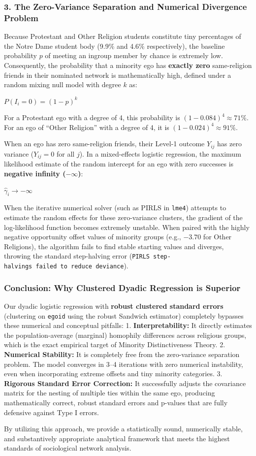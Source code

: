 \documentclass[
  letterpaper,
  DIV=11,
  numbers=noendperiod]{scrartcl}
\begin{document}
\subsubsection{3. The Zero-Variance Separation and Numerical Divergence
Problem}\label{the-zero-variance-separation-and-numerical-divergence-problem}

Because Protestant and Other Religion students constitute tiny
percentages of the Notre Dame student body (9.9\% and 4.6\%
respectively), the baseline probability \(p\) of meeting an ingroup
member by chance is extremely low. Consequently, the probability that a
minority ego has \textbf{exactly zero} same-religion friends in their
nominated network is mathematically high, defined under a random mixing
null model with degree \(k\) as:

\(P(I_i = 0) = (1 - p)^k\)

For a Protestant ego with a degree of 4, this probability is
\((1 - 0.084)^4 \approx 71\%\). For an ego of ``Other Religion'' with a
degree of 4, it is \((1 - 0.024)^4 \approx 91\%\).

When an ego has zero same-religion friends, their Level-1 outcome
\(Y_{ij}\) has zero variance (\(Y_{ij} = 0\) for all \(j\)). In a
mixed-effects logistic regression, the maximum likelihood estimate of
the random intercept for an ego with zero successes is \textbf{negative
infinity (\(-\infty\))}:

\(\hat{\gamma}_i \to -\infty\)

When the iterative numerical solver (such as PIRLS in \texttt{lme4})
attempts to estimate the random effects for these zero-variance
clusters, the gradient of the log-likelihood function becomes extremely
unstable. When paired with the highly negative opportunity offset values
of minority groups (e.g., \(-3.70\) for Other Religions), the algorithm
fails to find stable starting values and diverges, throwing the standard
step-halving error
(\texttt{PIRLS\ step-halvings\ failed\ to\ reduce\ deviance}).

\subsubsection{Conclusion: Why Clustered Dyadic Regression is
Superior}\label{conclusion-why-clustered-dyadic-regression-is-superior}

Our dyadic logistic regression with \textbf{robust clustered standard
errors} (clustering on \texttt{egoid} using the robust Sandwich
estimator) completely bypasses these numerical and conceptual pitfalls:
1. \textbf{Interpretability:} It directly estimates the
population-average (marginal) homophily differences across religious
groups, which is the exact empirical target of Minority Distinctiveness
Theory. 2. \textbf{Numerical Stability:} It is completely free from the
zero-variance separation problem. The model converges in 3--4 iterations
with zero numerical instability, even when incorporating extreme offsets
and tiny minority categories. 3. \textbf{Rigorous Standard Error
Correction:} It successfully adjusts the covariance matrix for the
nesting of multiple ties within the same ego, producing mathematically
correct, robust standard errors and p-values that are fully defensive
against Type I errors.

By utilizing this approach, we provide a statistically sound,
numerically stable, and substantively appropriate analytical framework
that meets the highest standards of sociological network analysis.
\end{document}
